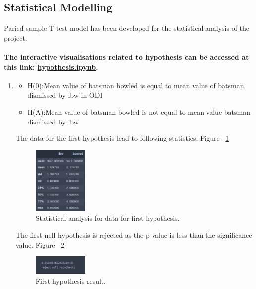 \documentclass[fleqn,10pt]{wlscirep}
\begin{document}
\begin{itemize}
\end{itemize}
\subsection{Statistical Modelling}
Paried sample T-test model has been developed for the statistical analysis of the project. \newline
\paragraph{The interactive visualisations related to hypothesis can be accessed at this link: \href{https://nbviewer.jupyter.org/github/dev-SB/cricket-bi/blob/master/hypothesis.ipynb}{hypothesis.ipynb}.}
\begin{enumerate}
\item
\begin{itemize}
\item H(0):Mean value of batsman bowled is equal to mean value of batsman dismissed by lbw in ODI
\item H(A):Mean value of batsman bowled is not equal to mean value batsman dismissed by lbw
\end{itemize}

The data for the first hypothesis lead to following statistics: Figure ~\ref{fig:eleven}
\begin{figure}[H]
    \centering
    \includegraphics[width=0.25\textwidth]{lbwbowled.png}
    \caption{Statistical analysis for data for first hypothesis.}
    \label{fig:eleven}
  \end{figure}

  The first null hypothesis is rejected as the p value is less than the significance value. Figure ~\ref{fig:twelve}
  \begin{figure}[H]
      \centering
      \includegraphics[width=0.25\textwidth]{lbwbowledhypo.png}
      \caption{First hypothesis result.}
      \label{fig:twelve}
    \end{figure}



\end{enumerate}
\end{document}
